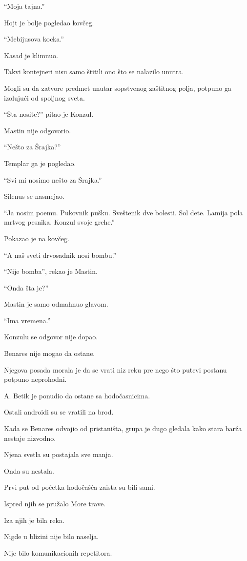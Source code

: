 ``Moja tajna.''

Hojt je bolje pogledao kovčeg.

``Mebijusova kocka.''

Kasad je klimnuo.

Takvi kontejneri nisu samo štitili ono što se nalazilo unutra.

Mogli su da zatvore predmet unutar sopstvenog zaštitnog polja, potpuno ga izolujući od spoljnog sveta.

``Šta nosite?'' pitao je Konzul.

Mastin nije odgovorio.

``Nešto za Šrajka?''

Templar ga je pogledao.

``Svi mi nosimo nešto za Šrajka.''

Silenus se nasmejao.

``Ja nosim poemu. Pukovnik pušku. Sveštenik dve bolesti. Sol dete. Lamija pola mrtvog pesnika. Konzul svoje grehe.''

Pokazao je na kovčeg.

``A naš sveti drvosadnik nosi bombu.''

``Nije bomba'', rekao je Mastin.

``Onda šta je?''

Mastin je samo odmahnuo glavom.

``Ima vremena.''

Konzulu se odgovor nije dopao.

\bigskip

Benares nije mogao da ostane.

Njegova posada morala je da se vrati niz reku pre nego što putevi postanu potpuno neprohodni.

A. Betik je ponudio da ostane sa hodočasnicima.

Ostali androidi su se vratili na brod.

Kada se Benares odvojio od pristaništa, grupa je dugo gledala kako stara barža nestaje nizvodno.

Njena svetla su postajala sve manja.

Onda su nestala.

Prvi put od početka hodočašća zaista su bili sami.

Ispred njih se pružalo More trave.

Iza njih je bila reka.

Nigde u blizini nije bilo naselja.

Nije bilo komunikacionih repetitora.


